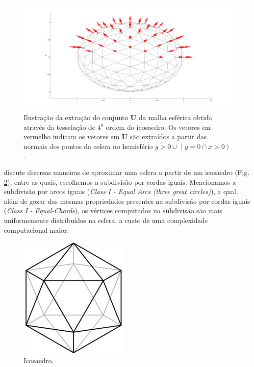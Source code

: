 \documentclass[
    12pt,                %
    oneside,            %
    a4paper,            %
    english,            %
    french,                %
    spanish,            %
    brazil                %
    ]{abntex2}
\begin{document}
\begin{figure}[ht]
    \centering
    \includegraphics[width=.8\linewidth, angle=0]{figs/HARDI/icosphere_normals.png}
    \caption{
    Ilustração da extração do conjunto $\mathbf{U}$ da malha esférica obtida através da tesselação de $4^a$ ordem do icosaedro. Os vetores em vermelho indicam os vetores em $\mathbf{U}$ são extraídos a partir das normais dos pontos da esfera no hemisfério $y > 0 \cup (y = 0 \cap x > 0)$.
    }
    \label{fig::direcoes}
   \hspace{1pt}
\end{figure}

 discute diversas maneiras de aproximar uma esfera a partir de um icosaedro (Fig. \ref{fig::icosaedro}), entre as quais, escolhemos a subdivisão por cordas iguais.  Mencionamos a subdivisão por arcos iguais (\textit{Class I - Equal Arcs (three great circles)}), a qual, além de gozar das mesmas propriedades presentes na subdivisão por cordas iguais  (\textit{Class I - Equal-Chords}), os vértices computados na subdivisão são mais uniformemente distribuídos na esfera, a custo de uma complexidade computacional maior.

\begin{figure}[ht]
    \centering
    \includegraphics[width=.3\linewidth, angle=0]{figs/HARDI/icosaedro.png}
    \caption{
    Icosaedro.
    }
    \label{fig::icosaedro}
   \hspace{1pt}
\end{figure}
\end{document}
